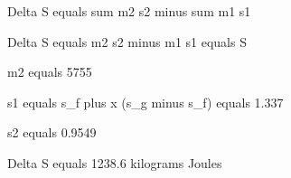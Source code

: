 Delta S equals sum m2 s2 minus sum m1 s1  

Delta S equals m2 s2 minus m1 s1 equals S  

m2 equals 5755  

s1 equals s_f plus x (s_g minus s_f) equals 1.337  

s2 equals 0.9549  

Delta S equals 1238.6 kilograms Joules